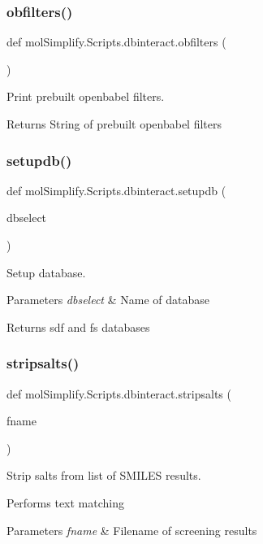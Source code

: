 \subsubsection{\texorpdfstring{obfilters()}{obfilters()}}
{\footnotesize\ttfamily def mol\+Simplify.\+Scripts.\+dbinteract.\+obfilters (\begin{DoxyParamCaption}{ }\end{DoxyParamCaption})}



Print prebuilt openbabel filters. 

\begin{DoxyReturn}{Returns}
String of prebuilt openbabel filters 
\end{DoxyReturn}
\mbox{\label{namespacemolSimplify_1_1Scripts_1_1dbinteract_abfa2f67547bce607376ee4c470a03365}} 
\subsubsection{\texorpdfstring{setupdb()}{setupdb()}}
{\footnotesize\ttfamily def mol\+Simplify.\+Scripts.\+dbinteract.\+setupdb (\begin{DoxyParamCaption}\item[{}]{dbselect }\end{DoxyParamCaption})}



Setup database. 


\begin{DoxyParams}{Parameters}
{\em dbselect} & Name of database \\
\hline
\end{DoxyParams}
\begin{DoxyReturn}{Returns}
sdf and fs databases 
\end{DoxyReturn}
\mbox{\label{namespacemolSimplify_1_1Scripts_1_1dbinteract_a3e69e497ffabc7e01ac66782b19bc542}} 
\subsubsection{\texorpdfstring{stripsalts()}{stripsalts()}}
{\footnotesize\ttfamily def mol\+Simplify.\+Scripts.\+dbinteract.\+stripsalts (\begin{DoxyParamCaption}\item[{}]{fname }\end{DoxyParamCaption})}



Strip salts from list of S\+M\+I\+L\+ES results. 

Performs text matching 
\begin{DoxyParams}{Parameters}
{\em fname} & Filename of screening results \\
\hline
\end{DoxyParams}
